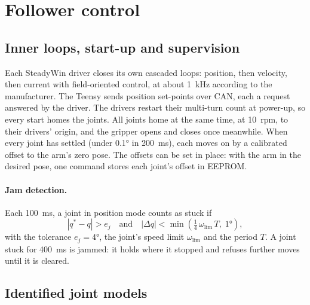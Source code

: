 \documentclass[11pt,a4paper]{article}
\begin{document}
\section{Follower control}
\label{sec:control}

\subsection{Inner loops, start-up and supervision}

Each SteadyWin driver closes its own cascaded loops: position, then velocity, then current with field-oriented
control, at about \SI{1}{\kilo\hertz} according to the manufacturer. The Teensy sends position set-points over
CAN, each a request answered by the driver. The drivers restart their multi-turn count at power-up, so every
start homes the joints. All joints home at the same time, at \SI{10}{rpm}, to their drivers' origin, and the
gripper opens and closes once meanwhile. When every joint has settled (under \ang{0.1} in
\SI{200}{\milli\second}), each moves on by a calibrated offset to the arm's zero pose. The offsets can be set in
place: with the arm in the desired pose, one command stores each joint's offset in EEPROM.

\paragraph{Jam detection.} Each \SI{100}{\milli\second}, a joint in position mode counts as stuck if
\begin{equation}
  |q^*-q|>e_j\quad\text{and}\quad|\Delta q|<\min\!\left(\tfrac14\,\omega_{\lim}\,T,\;\ang{1}\right),
\end{equation}
with the tolerance $e_j=\ang{4}$, the joint's speed limit $\omega_{\lim}$ and the period $T$. A joint stuck for
\SI{400}{\milli\second} is jammed: it holds where it stopped and refuses further moves until it is cleared.

\subsection{Identified joint models}
\end{document}
